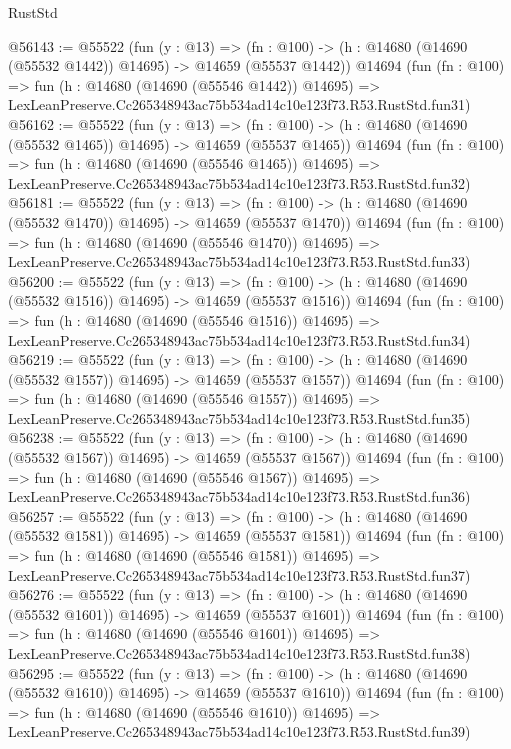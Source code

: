 \begin{lexlean}{RustStd}
\begin{coremodule}
@56143 := @55522
    (fun (y : @13) =>
    (fn : @100) -> (h : @14680 (@14690 (@55532 @1442)) @14695) -> @14659 (@55537 @1442))
    @14694
    (fun (fn : @100) =>
    fun (h : @14680 (@14690 (@55546 @1442)) @14695) =>
    LexLeanPreserve.Cc265348943ac75b534ad14c10e123f73.R53.RustStd.fun31)
@56162 := @55522
    (fun (y : @13) =>
    (fn : @100) -> (h : @14680 (@14690 (@55532 @1465)) @14695) -> @14659 (@55537 @1465))
    @14694
    (fun (fn : @100) =>
    fun (h : @14680 (@14690 (@55546 @1465)) @14695) =>
    LexLeanPreserve.Cc265348943ac75b534ad14c10e123f73.R53.RustStd.fun32)
@56181 := @55522
    (fun (y : @13) =>
    (fn : @100) -> (h : @14680 (@14690 (@55532 @1470)) @14695) -> @14659 (@55537 @1470))
    @14694
    (fun (fn : @100) =>
    fun (h : @14680 (@14690 (@55546 @1470)) @14695) =>
    LexLeanPreserve.Cc265348943ac75b534ad14c10e123f73.R53.RustStd.fun33)
@56200 := @55522
    (fun (y : @13) =>
    (fn : @100) -> (h : @14680 (@14690 (@55532 @1516)) @14695) -> @14659 (@55537 @1516))
    @14694
    (fun (fn : @100) =>
    fun (h : @14680 (@14690 (@55546 @1516)) @14695) =>
    LexLeanPreserve.Cc265348943ac75b534ad14c10e123f73.R53.RustStd.fun34)
@56219 := @55522
    (fun (y : @13) =>
    (fn : @100) -> (h : @14680 (@14690 (@55532 @1557)) @14695) -> @14659 (@55537 @1557))
    @14694
    (fun (fn : @100) =>
    fun (h : @14680 (@14690 (@55546 @1557)) @14695) =>
    LexLeanPreserve.Cc265348943ac75b534ad14c10e123f73.R53.RustStd.fun35)
@56238 := @55522
    (fun (y : @13) =>
    (fn : @100) -> (h : @14680 (@14690 (@55532 @1567)) @14695) -> @14659 (@55537 @1567))
    @14694
    (fun (fn : @100) =>
    fun (h : @14680 (@14690 (@55546 @1567)) @14695) =>
    LexLeanPreserve.Cc265348943ac75b534ad14c10e123f73.R53.RustStd.fun36)
@56257 := @55522
    (fun (y : @13) =>
    (fn : @100) -> (h : @14680 (@14690 (@55532 @1581)) @14695) -> @14659 (@55537 @1581))
    @14694
    (fun (fn : @100) =>
    fun (h : @14680 (@14690 (@55546 @1581)) @14695) =>
    LexLeanPreserve.Cc265348943ac75b534ad14c10e123f73.R53.RustStd.fun37)
@56276 := @55522
    (fun (y : @13) =>
    (fn : @100) -> (h : @14680 (@14690 (@55532 @1601)) @14695) -> @14659 (@55537 @1601))
    @14694
    (fun (fn : @100) =>
    fun (h : @14680 (@14690 (@55546 @1601)) @14695) =>
    LexLeanPreserve.Cc265348943ac75b534ad14c10e123f73.R53.RustStd.fun38)
@56295 := @55522
    (fun (y : @13) =>
    (fn : @100) -> (h : @14680 (@14690 (@55532 @1610)) @14695) -> @14659 (@55537 @1610))
    @14694
    (fun (fn : @100) =>
    fun (h : @14680 (@14690 (@55546 @1610)) @14695) =>
    LexLeanPreserve.Cc265348943ac75b534ad14c10e123f73.R53.RustStd.fun39)

\end{coremodule}
\end{lexlean}
